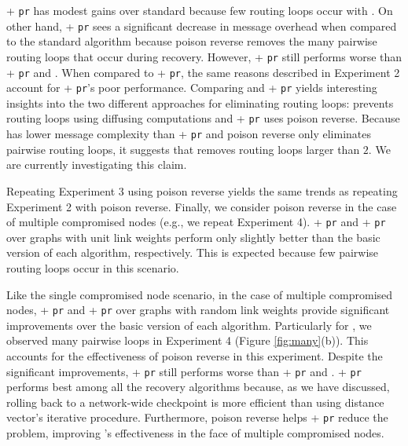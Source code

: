 \cpr + {\tt pr} has modest gains over standard \cpr because few routing loops occur with \cprs. On other hand,
\second + {\tt pr} sees a significant decrease in message overhead when compared to the standard \second algorithm because poison reverse removes the many pairwise routing 
loops that occur during \second recovery. However,  \second + {\tt pr} still performs worse than \cpr + {\tt pr} and \purges.  When compared to \cpr + {\tt pr}, 
the same reasons described in Experiment 2 account for \second + {\tt pr}'s poor performance. %
Comparing \purge and \second + {\tt pr} yields interesting insights into the two different approaches for eliminating routing loops: \purge prevents routing loops using diffusing computations
and \second + {\tt pr} uses poison reverse.
Because \purge has lower message complexity than \second + {\tt pr} and poison reverse only eliminates pairwise routing loops, 
it suggests that \purge removes routing loops larger than $2$.
We are currently investigating this claim.

Repeating Experiment 3 using poison reverse yields the same trends as repeating Experiment 2 with poison reverse.  Finally, we consider poison reverse in the case 
of multiple compromised nodes (e.g., we repeat Experiment 4). \second + {\tt pr} and \cpr + {\tt pr} over \er graphs with unit link weights perform only slightly 
better than the basic version of each algorithm, respectively.  This is expected because few pairwise routing loops occur in this scenario.  

Like the single compromised node scenario, in the case of multiple compromised nodes, \second + {\tt pr} and \cpr + {\tt pr} over \er graphs with random link weights provide 
significant improvements over the basic version of each algorithm.  Particularly for \seconds, we observed many pairwise loops in Experiment 4 (Figure \ref{fig:many}(b)). This 
accounts for the effectiveness of poison reverse in this experiment.  Despite the significant improvements, \second + {\tt pr} still performs worse than \cpr + {\tt pr} and \purges. 
\cpr + {\tt pr} performs best among all the recovery algorithms because, as we have discussed, rolling back to a network-wide checkpoint is more efficient than using distance vector's
iterative procedure. Furthermore, poison reverse helps \cpr + {\tt pr} reduce the \infinity problem, improving \cprs's effectiveness in the face of multiple 
compromised nodes. 


